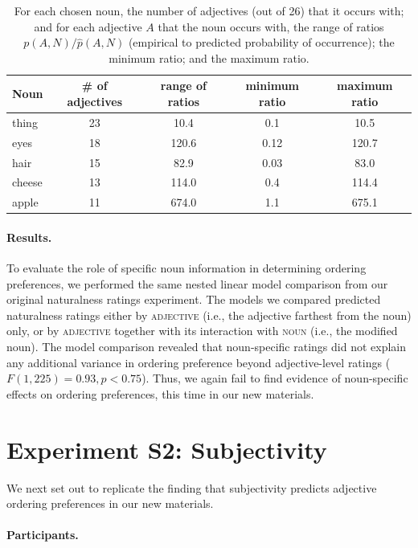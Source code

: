 \documentclass[12pt]{article}
\begin{document}
\renewcommand\thetable{S.\arabic{table}}
\begin{table}
\centering
\begin{tabular}{l c c c c}
\toprule
Noun & \# of adjectives & range of ratios & minimum ratio & maximum ratio\\
\midrule
thing & 23 & 10.4 & 0.1 & 10.5 \\
eyes & 18 & 120.6 & 0.12 & 120.7 \\
hair & 15 & 82.9 & 0.03 & 83.0 \\
cheese & 13 & 114.0 & 0.4 & 114.4 \\
apple & 11 & 674.0 & 1.1 & 675.1 \\
\bottomrule
\end{tabular}
\caption{For each chosen noun, the number of adjectives (out of 26) that it occurs with; and for each adjective $A$ that the noun occurs with, the range of ratios $p(A,N) / \hat{p}(A,N)$ (empirical to predicted probability of occurrence); the minimum ratio; and the maximum ratio.}
\label{tab:nouns}
\end{table}




\paragraph{Results.}

To evaluate the role of specific noun information in determining ordering preferences, we performed the same nested linear model comparison from our original naturalness ratings experiment. The models we compared predicted naturalness ratings either by \textsc{adjective} (i.e., the adjective farthest from the noun) only, or by \textsc{adjective} together with its interaction with \textsc{noun} (i.e., the modified noun).
The model comparison revealed that noun-specific ratings did not explain any additional variance in ordering preference beyond adjective-level ratings ($F(1,225) = 0.93, p < 0.75$).  Thus, we again fail to find evidence of noun-specific effects on ordering preferences, this time in our new materials. 

\section*{Experiment S2: Subjectivity}

We next set out to replicate the finding that subjectivity predicts adjective ordering preferences in our new materials.

\paragraph{Participants.}
\end{document}
